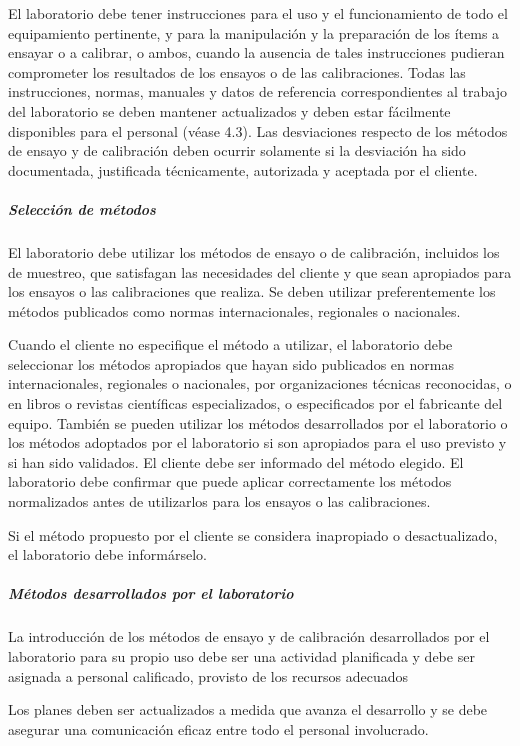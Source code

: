 \par \noindent
El laboratorio debe tener instrucciones para el uso y el funcionamiento de todo el equipamiento pertinente, y
para la manipulación y la preparación de los ítems a ensayar o a calibrar, o ambos, cuando la ausencia de
tales instrucciones pudieran comprometer los resultados de los ensayos o de las calibraciones. Todas las
instrucciones, normas, manuales y datos de referencia correspondientes al trabajo del laboratorio se deben
mantener actualizados y deben estar fácilmente disponibles para el personal (véase 4.3). Las desviaciones
respecto de los métodos de ensayo y de calibración deben ocurrir solamente si la desviación ha sido
documentada, justificada técnicamente, autorizada y aceptada por el cliente.

\subparagraph{Selección de métodos}
El laboratorio debe utilizar los métodos de ensayo o de calibración, incluidos los de muestreo, que satisfagan
las necesidades del cliente y que sean apropiados para los ensayos o las calibraciones que realiza. Se deben
utilizar preferentemente los métodos publicados como normas internacionales, regionales o nacionales. 

\par \noindent
Cuando el cliente no especifique el método a utilizar, el laboratorio debe seleccionar los métodos apropiados que
hayan sido publicados en normas internacionales, regionales o nacionales, por organizaciones técnicas
reconocidas, o en libros o revistas científicas especializados, o especificados por el fabricante del equipo. También
se pueden utilizar los métodos desarrollados por el laboratorio o los métodos adoptados por el laboratorio si son
apropiados para el uso previsto y si han sido validados. El cliente debe ser informado del método elegido. El
laboratorio debe confirmar que puede aplicar correctamente los métodos normalizados antes de utilizarlos para los
ensayos o las calibraciones.

\par \noindent
Si el método propuesto por el cliente se considera inapropiado o desactualizado, el laboratorio debe
informárselo.

\subparagraph{Métodos desarrollados por el laboratorio}
La introducción de los métodos de ensayo y de calibración desarrollados por el laboratorio para su propio uso
debe ser una actividad planificada y debe ser asignada a personal calificado, provisto de los recursos adecuados

\par \noindent
Los planes deben ser actualizados a medida que avanza el desarrollo y se debe asegurar una comunicación
eficaz entre todo el personal involucrado.

